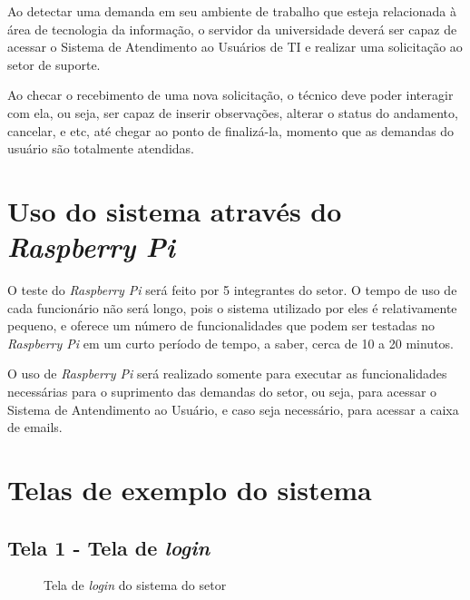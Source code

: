 Ao detectar uma demanda em seu ambiente de trabalho que esteja relacionada à área de tecnologia da informação, o servidor da universidade deverá ser capaz de acessar o Sistema de Atendimento ao Usuários de TI e realizar uma solicitação ao setor de suporte.

Ao checar o recebimento de uma nova solicitação, o técnico deve poder interagir com ela, ou seja, ser capaz de inserir observações, alterar o status do andamento, cancelar, e etc, até chegar ao ponto de finalizá-la, momento que as demandas do usuário são totalmente atendidas.

\section{Uso do sistema através do \textit{Raspberry Pi}}

O teste do \textit{Raspberry Pi} será feito por 5 integrantes do setor. O tempo de uso de cada funcionário não será longo, pois o sistema utilizado por eles é relativamente pequeno, e oferece um número de funcionalidades que podem ser testadas no \textit{Raspberry Pi} em um curto período de tempo, a saber, cerca de 10 a 20 minutos.

O uso de \textit{Raspberry Pi} será realizado somente para executar as funcionalidades necessárias para o suprimento das demandas do setor, ou seja, para acessar o Sistema de Antendimento ao Usuário, e caso seja necessário, para acessar a caixa de emails.

\newpage

\section{Telas de exemplo do sistema}

\subsection{Tela 1 - Tela de \textit{login}}

\begin{figure}[ht]
    \centering
    \caption{Tela de \textit{login} do sistema do setor}
\end{figure}

